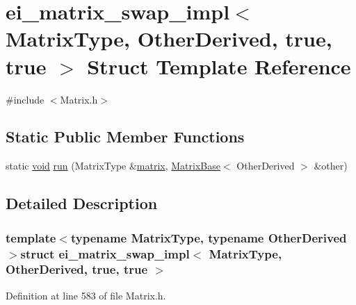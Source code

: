 \hypertarget{structei__matrix__swap__impl_3_01_matrix_type_00_01_other_derived_00_01true_00_01true_01_4}{\section{ei\-\_\-matrix\-\_\-swap\-\_\-impl$<$ Matrix\-Type, Other\-Derived, true, true $>$ Struct Template Reference}
\label{structei__matrix__swap__impl_3_01_matrix_type_00_01_other_derived_00_01true_00_01true_01_4}
}


{\ttfamily \#include $<$Matrix.\-h$>$}

\subsection*{Static Public Member Functions}
\begin{DoxyCompactItemize}
\item 
static \hyperlink{group___u_a_v_objects_plugin_ga444cf2ff3f0ecbe028adce838d373f5c}{void} \hyperlink{structei__matrix__swap__impl_3_01_matrix_type_00_01_other_derived_00_01true_00_01true_01_4_a1544093c0a5188170070370df5749411}{run} (Matrix\-Type \&\hyperlink{glext_8h_a7b24a3f2f56eb1244ae69dacb4fecb6f}{matrix}, \hyperlink{class_matrix_base}{Matrix\-Base}$<$ Other\-Derived $>$ \&other)
\end{DoxyCompactItemize}


\subsection{Detailed Description}
\subsubsection*{template$<$typename Matrix\-Type, typename Other\-Derived$>$struct ei\-\_\-matrix\-\_\-swap\-\_\-impl$<$ Matrix\-Type, Other\-Derived, true, true $>$}



Definition at line 583 of file Matrix.\-h.



